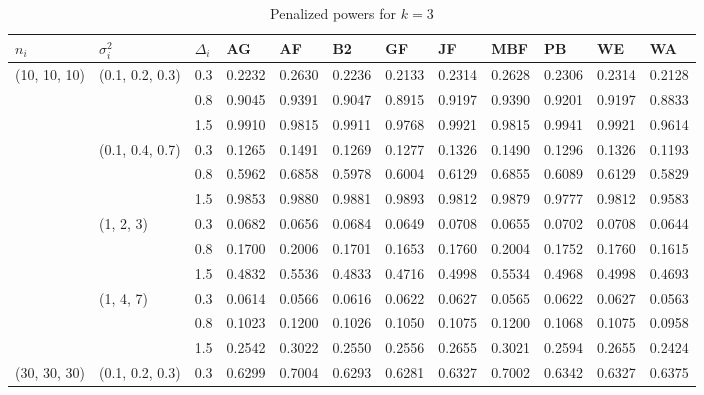 \begin{table}[h]\footnotesize
\caption{Penalized powers for $k=3$}
\begin{tabular}{llllllllllll}\toprule
$n_i$           & $\sigma_i^2$               &$\Delta_i$ & AG     & AF     & B2     & GF     & JF     & MBF    & PB     & WE     & WA     \\\toprule
(10, 10, 10) 	& (0.1, 0.2, 0.3)	& 0.3 	& 0.2232 	& 0.2630  & 0.2236 	& 0.2133 	& 0.2314 	& 0.2628 	& 0.2306 	& 0.2314 	& 0.2128 \\
             		&                 	& 0.8 	& 0.9045 	& 0.9391 	& 0.9047 	& 0.8915 	& 0.9197 	& 0.9390 	& 0.9201 	& 0.9197 	& 0.8833 \\
             		&                 	& 1.5 	& 0.9910 	& 0.9815 	& 0.9911 	& 0.9768	& 0.9921 	& 0.9815 	& 0.9941 	& 0.9921 	& 0.9614 \\
             		& (0.1, 0.4, 0.7)	& 0.3 	& 0.1265 	& 0.1491 	& 0.1269 	& 0.1277 	& 0.1326 	& 0.1490 	& 0.1296 	& 0.1326 	& 0.1193 \\
             		&                 	& 0.8 	& 0.5962 	& 0.6858 	& 0.5978 	& 0.6004 	& 0.6129 	& 0.6855 	& 0.6089	& 0.6129 	& 0.5829 \\
             		&                 	& 1.5 	& 0.9853 	& 0.9880  & 0.9881 	& 0.9893 	& 0.9812 	& 0.9879 	& 0.9777 	& 0.9812 	& 0.9583 \\
             		& (1, 2, 3)       	& 0.3 	& 0.0682 	& 0.0656 	& 0.0684 	& 0.0649 	& 0.0708 	& 0.0655 	& 0.0702 	& 0.0708	& 0.0644 \\
             		&                 	& 0.8 	& 0.1700 	& 0.2006 	& 0.1701 	& 0.1653 	& 0.1760  	& 0.2004 	& 0.1752 	& 0.1760  	& 0.1615 \\
             		&                 	& 1.5 	& 0.4832 	& 0.5536 	& 0.4833 	& 0.4716 	& 0.4998 	& 0.5534 	& 0.4968 	& 0.4998 	& 0.4693 \\
             		& (1, 4, 7)       	& 0.3 	& 0.0614 	& 0.0566 	& 0.0616 	& 0.0622 	& 0.0627 	& 0.0565 	& 0.0622 	& 0.0627 	& 0.0563 \\
             		&                 	& 0.8 	& 0.1023 	& 0.1200   & 0.1026 	& 0.1050  	& 0.1075 	& 0.1200  	& 0.1068 	& 0.1075 	& 0.0958 \\
             		&                 	& 1.5 	& 0.2542 	& 0.3022 	& 0.2550  	& 0.2556 	& 0.2655 	& 0.3021 	& 0.2594 	& 0.2655 	& 0.2424 \\\hline
(30, 30, 30) 	& (0.1, 0.2, 0.3)	& 0.3 	& 0.6299 	& 0.7004 	& 0.6293 	& 0.6281 	& 0.6327 	& 0.7002 	& 0.6342 	& 0.6327 	& 0.6375 \\

\end{tabular}
\end{table}
